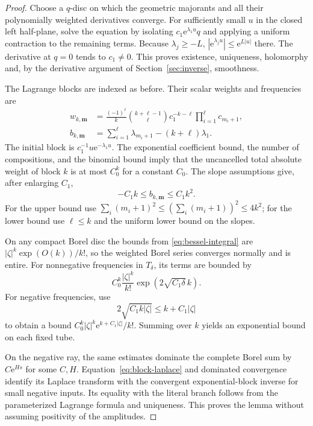 \documentclass[11pt,a4paper]{article}
\numberwithin{equation}{section}
\theoremstyle{definition}
\theoremstyle{remark}
\newcommand{\ee}{\mathrm e}
\begin{document}
\begin{proof}
Choose a $q$-disc on which the geometric majorants and all their
polynomially weighted derivatives converge.  For sufficiently small
$u$ in the closed left half-plane, solve the equation by isolating
$c_1\ee^{\lambda_1u}q$ and applying a uniform contraction to the
remaining terms.  Because $\lambda_j\ge-L$,
$|\ee^{\lambda_j u}|\le\ee^{L|u|}$ there.  The derivative at $q=0$
tends to $c_1\ne0$.  This proves existence, uniqueness, holomorphy and,
by the derivative argument of Section~\ref{sec:inverse}, smoothness.

The Lagrange blocks are indexed as before.  Their scalar weights and
frequencies are
\begin{align}
 w_{k,\mathbf m}
   &=\frac{(-1)^\ell}{k}\binom{k+\ell-1}{\ell}
       c_1^{-k-\ell}\prod_{i=1}^{\ell}c_{m_i+1},
       \label{eq:general-weight}\\
 b_{k,\mathbf m}
   &=\sum_{i=1}^{\ell}\lambda_{m_i+1}-(k+\ell)\lambda_1.
       \label{eq:general-frequency}
\end{align}
The initial block is $c_1^{-1}u\ee^{-\lambda_1u}$.
The exponential coefficient bound, the number of compositions, and the
binomial bound imply that the uncancelled total absolute weight of
block $k$ is at most $C_0^k$ for a constant $C_0$.
The slope assumptions give, after enlarging $C_1$,
\begin{equation}
 -C_1k\le b_{k,\mathbf m}\le C_1k^2.
 \label{eq:general-frequency-bounds}
\end{equation}
For the upper bound use
$\sum_i(m_i+1)^2\le(\sum_i(m_i+1))^2\le4k^2$;
for the lower bound use $\ell\le k$ and the uniform lower bound
on the slopes.

On any compact Borel disc the bounds from
\eqref{eq:bessel-integral} are $|\zeta|^k\exp(O(k))/k!$,
so the weighted Borel series converges normally and is entire.
For nonnegative frequencies in $T_\delta$, its terms are bounded by
\[
 C_0^k\frac{|\zeta|^k}{k!}
          \exp(2\sqrt{C_1\delta}\,k).
\]
For negative frequencies, use
\[
 2\sqrt{C_1k|\zeta|}\le k+C_1|\zeta|
\]
to obtain a bound
$C_0^k|\zeta|^k\ee^{k+C_1|\zeta|}/k!$.
Summing over $k$ yields an exponential bound on each fixed tube.

On the negative ray, the same estimates dominate the complete Borel
sum by $C\ee^{Hs}$ for some $C,H$.  Equation~\eqref{eq:block-laplace}
and dominated convergence identify its Laplace transform with the
convergent exponential-block inverse for small negative inputs.
Its equality with the literal branch follows from the parameterized
Lagrange formula and uniqueness.  This proves the lemma without
assuming positivity of the amplitudes.
\end{proof}
\end{document}
